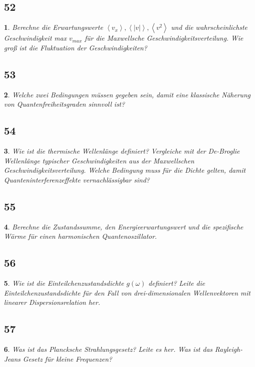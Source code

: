 \documentclass[12pt,a4paper]{report}
\newtheorem{myfrag}{}%
\begin{document}
\subsection{52}
\begin{myfrag}
Berechne die Erwartungswerte $\left\langle v_x \right\rangle , \left\langle |v| \right\rangle , \left\langle v^2 \right\rangle $ und die wahrscheinlichste
Geschwindigkeit max $v_{max}$ für die Maxwellsche Geschwindigkeitsverteilung. Wie
groß ist die Fluktuation der Geschwindigkeiten?
\end{myfrag}
\subsection{53}
\begin{myfrag}
Welche zwei Bedingungen müssen gegeben sein, damit eine klassische
Näherung von Quantenfreiheitsgraden sinnvoll ist?
\end{myfrag}
\subsection{54}
\begin{myfrag}
Wie ist die thermische Wellenlänge definiert? Vergleiche mit der De-Broglie
Wellenlänge typischer Geschwindigkeiten aus der Maxwellschen
Geschwindigkeitsverteilung. Welche Bedingung muss für die Dichte gelten,
damit Quanteninterferenzeffekte vernachlässigbar sind?
\end{myfrag}
\subsection{55}
\begin{myfrag}
Berechne die Zustandssumme, den Energieerwartungswert und die
spezifische Wärme für einen harmonischen Quantenoszillator.
\end{myfrag}
\subsection{56}
\begin{myfrag}
Wie ist die Einteilchenzustandsdichte $g(\omega )$ definiert? Leite die
Einteilchenzustandsdichte für den Fall von drei-dimensionalen
Wellenvektoren mit linearer Dispersionsrelation her.
\end{myfrag}
\subsection{57}
\begin{myfrag}
Was ist das Plancksche Strahlungsgesetz? Leite es her. Was ist das
Rayleigh-Jeans Gesetz für kleine Frequenzen?
\end{myfrag}
\end{document}
